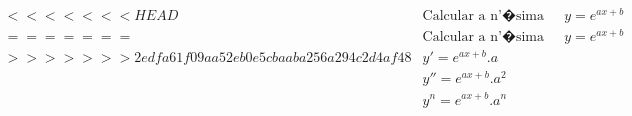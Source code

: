 \begin{ex}
\begin{align}
<<<<<<< HEAD
&\text{Calcular a n'�sima derivada de} \quad y=e^{ax+b}\nonumber\\
=======
&\text{Calcular a n'�sima derivada de} \quad y=e^{ax+b}\nonumber\\
>>>>>>> 2edfa61f09aa52eb0e5cbaaba256a294c2d4af48
&y'=e^{ax+b}.a\nonumber\\
&y''=e^{ax+b}.a^2\nonumber\\
&y^{n}=e^{ax+b}.a^{n}\nonumber
\end{align}
\end{ex}